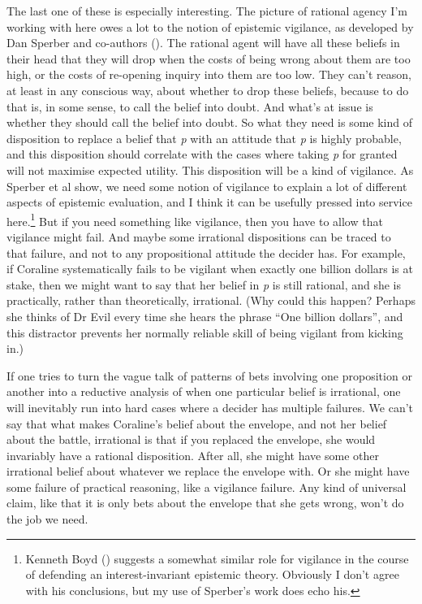 \documentclass[
  12pt,
  letterpaper,
]{scrbook}
\begin{document}
The last one of these is especially interesting. The picture of rational
agency I'm working with here owes a lot to the notion of epistemic
vigilance, as developed by Dan Sperber and co-authors
(). The rational
agent will have all these beliefs in their head that they will drop when
the costs of being wrong about them are too high, or the costs of
re-opening inquiry into them are too low. They can't reason, at least in
any conscious way, about whether to drop these beliefs, because to do
that is, in some sense, to call the belief into doubt. And what's at
issue is whether they should call the belief into doubt. So what they
need is some kind of disposition to replace a belief that \emph{p} with
an attitude that \emph{p} is highly probable, and this disposition
should correlate with the cases where taking \emph{p} for granted will
not maximise expected utility. This disposition will be a kind of
vigilance. As Sperber et al show, we need some notion of vigilance to
explain a lot of different aspects of epistemic evaluation, and I think
it can be usefully pressed into service here.\footnote{Kenneth Boyd
  () suggests a somewhat similar role for
  vigilance in the course of defending an interest-invariant epistemic
  theory. Obviously I don't agree with his conclusions, but my use of
  Sperber's work does echo his.} But if you need something like
vigilance, then you have to allow that vigilance might fail. And maybe
some irrational dispositions can be traced to that failure, and not to
any propositional attitude the decider has. For example, if Coraline
systematically fails to be vigilant when exactly one billion dollars is
at stake, then we might want to say that her belief in \emph{p} is still
rational, and she is practically, rather than theoretically, irrational.
(Why could this happen? Perhaps she thinks of Dr Evil every time she
hears the phrase ``One billion dollars'', and this distractor prevents
her normally reliable skill of being vigilant from kicking in.)

If one tries to turn the vague talk of patterns of bets involving one
proposition or another into a reductive analysis of when one particular
belief is irrational, one will inevitably run into hard cases where a
decider has multiple failures. We can't say that what makes Coraline's
belief about the envelope, and not her belief about the battle,
irrational is that if you replaced the envelope, she would invariably
have a rational disposition. After all, she might have some other
irrational belief about whatever we replace the envelope with. Or she
might have some failure of practical reasoning, like a vigilance
failure. Any kind of universal claim, like that it is only bets about
the envelope that she gets wrong, won't do the job we need.
\end{document}
